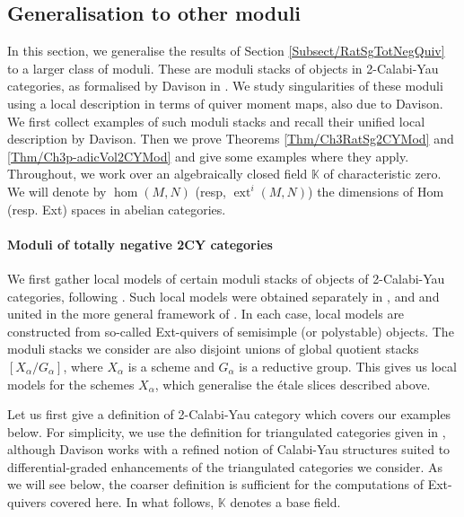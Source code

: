 \documentclass[11pt,english]{article}
\numberwithin{equation}{section}
\numberwithin{figure}{section}
\theoremstyle{definition}
\theoremstyle{plain}
\theoremstyle{remark}
\DeclareMathOperator{\ext}{ext}
\newcommand\KK{\mathbb{K}}
\begin{document}
\subsection{Generalisation to other moduli \label{Subsect/Mod2CY}}

In this section, we generalise the results of Section \ref{Subsect/RatSgTotNegQuiv}
to a larger class of moduli. These are moduli stacks of objects in
2-Calabi-Yau categories, as formalised by Davison in \cite{Dav21a}.
We study singularities of these moduli using a local description in
terms of quiver moment maps, also due to Davison. We first collect
examples of such moduli stacks and recall their unified local description
by Davison. Then we prove Theorems \ref{Thm/Ch3RatSg2CYMod} and \ref{Thm/Ch3p-adicVol2CYMod}
and give some examples where they apply. Throughout, we work over
an algebraically closed field $\KK$ of characteristic zero. We will
denote by $\hom(M,N)$ (resp, $\ext^{i}(M,N)$) the dimensions of
Hom (resp. Ext) spaces in abelian categories.

\paragraph*{Moduli of totally negative 2CY categories}

We first gather local models of certain moduli stacks of objects of
2-Calabi-Yau categories, following \cite{Dav21a}. Such local models
were obtained separately in \cite{CB03a,Bud21}, \cite{BGV16,KS23a}
and \cite{AS18,BZ19} and united in the more general framework of
\cite{Dav21a}. In each case, local models are constructed from so-called
Ext-quivers of semisimple (or polystable) objects. The moduli stacks
we consider are also disjoint unions of global quotient stacks $[X_{\alpha}/G_{\alpha}]$,
where $X_{\alpha}$ is a scheme and $G_{\alpha}$ is a reductive group.
This gives us local models for the schemes $X_{\alpha}$, which generalise
the étale slices described above.

Let us first give a definition of 2-Calabi-Yau category which covers
our examples below. For simplicity, we use the definition for triangulated
categories given in \cite[\S2.6.]{Kel08}, although Davison works
with a refined notion of Calabi-Yau structures suited to differential-graded
enhancements of the triangulated categories we consider. As we will
see below, the coarser definition is sufficient for the computations
of Ext-quivers covered here. In what follows, $\KK$ denotes a base
field.
\end{document}
